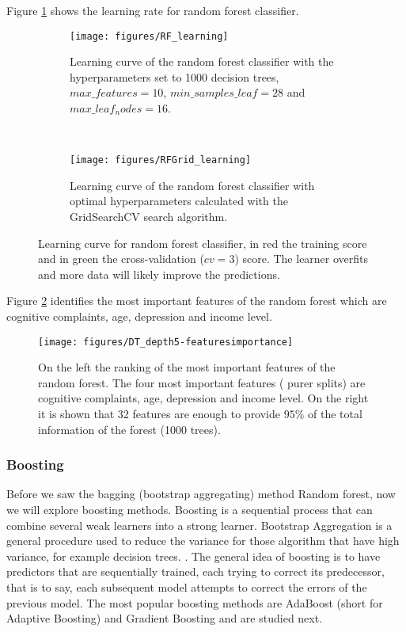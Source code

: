 \documentclass[11pt]{article}
\theoremstyle{definition}
\theoremstyle{remark}
\begin{document}
Figure \ref{fig:rf_learning} shows the learning rate for random forest classifier. 
\begin{figure}[H]
    \centering
    \begin{subfigure}[t]{.8\textwidth}
        \centering
        \texttt{[image: figures/RF\_learning]}
        \caption{Learning curve of the random forest classifier with the hyperparameters set to 1000 decision trees, $max\_features= 10$, $min\_samples\_leaf=28$ and $max\_leaf_nodes=16$.}
    \end{subfigure}
    ~ 
    \begin{subfigure}[t]{.8\textwidth}
        \centering
        \texttt{[image: figures/RFGrid\_learning]}
        \caption{Learning curve of the random forest classifier with optimal hyperparameters calculated with the GridSearchCV search algorithm.}
    \end{subfigure}%
    
    \caption{Learning curve for random forest classifier, in red the training score and in green the cross-validation ($cv=3$) score. The learner overfits and more data will likely improve the predictions.} \label{fig:rf_learning}
\end{figure}

Figure \ref{fig:rf-features} identifies the most important features of the random forest which are cognitive complaints, age, depression and income level.
\begin{figure}[H]
        \centering
        \texttt{[image: figures/DT\_depth5-featuresimportance]}
        \caption{On the left the ranking of the most important features of the random forest. The four most important features ( purer splits) are cognitive complaints, age, depression and income level. On the right it is shown that 32 features are enough to provide $95\%$ of the total information of the forest (1000 trees).   
        } \label{fig:rf-features}
\end{figure}

\subsubsection{Boosting}
\label{se:resgradboosting}

Before we saw the bagging (bootstrap aggregating) method Random forest, now we will explore boosting methods.
Boosting is a sequential process that can combine several weak learners into a strong learner. Bootstrap Aggregation is a general procedure used to reduce the variance for those algorithm that have high variance, for example  decision trees. . The general idea of boosting is to have predictors that are sequentially trained, each trying to correct its predecessor, that is to say, each subsequent model attempts to correct the errors of the previous model.
The most popular boosting methods are AdaBoost (short for Adaptive Boosting) and Gradient Boosting and are studied next.
\end{document}
